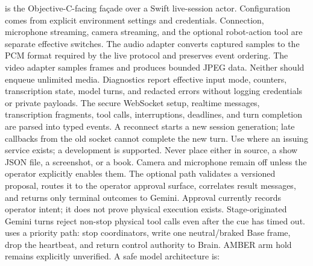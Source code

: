 {} is the Objective-C-facing façade over a Swift live-session actor. Configuration comes from explicit environment settings and credentials. Connection, microphone streaming, camera streaming, and the optional robot-action tool are separate effective switches.\markdownRendererParagraphSeparator
{}The audio adapter converts captured samples to the PCM format required by the live protocol and preserves event ordering. The video adapter samples frames and produces bounded JPEG data. Neither should enqueue unlimited media. Diagnostics report effective input mode, counters, transcription state, model turns, and redacted errors without logging credentials or private payloads.\markdownRendererParagraphSeparator
{}The secure WebSocket setup, realtime messages, transcription fragments, tool calls, interruptions, deadlines, and turn completion are parsed into typed events. A reconnect starts a new session generation; late callbacks from the old socket cannot complete the new turn.\markdownRendererParagraphSeparator
{}Use  where an issuing service exists; a development  is supported. Never place either in source, a show JSON file, a screenshot, or a book. Camera and microphone remain off unless the operator explicitly enables them.\markdownRendererInterblockSeparator
{}
\markdownRendererSectionEnd \markdownRendererSectionBegin
{}\markdownRendererInterblockSeparator
{}The optional  path validates a versioned proposal, routes it to the operator approval surface, correlates result messages, and returns only terminal outcomes to Gemini. Approval currently records operator intent; it does not prove physical execution exists.\markdownRendererParagraphSeparator
{}Stage-originated Gemini turns reject non-stop physical tool calls even after the cue has timed out.  uses a priority path: stop coordinators, write one neutral/braked Base frame, drop the heartbeat, and return control authority to Brain. AMBER arm hold remains explicitly unverified.\markdownRendererParagraphSeparator
{}A safe model architecture is:\markdownRendererInterblockSeparator
{}\markdownRendererInterblockSeparator
